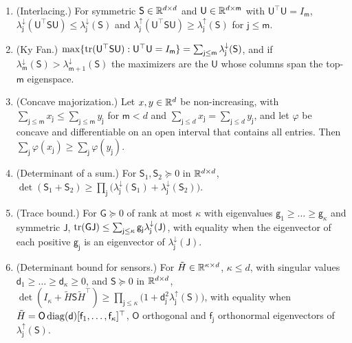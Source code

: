 \begin{lemma}\label{lem:env-eigen}
\begin{enumerate}
\item[(a)] (Interlacing.) For symmetric $\mathsf S\in\mathbb{R}^{d\times d}$ and $\mathsf U\in\mathbb{R}^{d\times\mathsf m}$ with $\mathsf U^\top\mathsf U=I_{\mathsf m}$, $\lambda^\downarrow_{\mathsf j}(\mathsf U^\top\mathsf S\mathsf U)\le\lambda^\downarrow_{\mathsf j}(\mathsf S)$ and $\lambda^\uparrow_{\mathsf j}(\mathsf U^\top\mathsf S\mathsf U)\ge\lambda^\uparrow_{\mathsf j}(\mathsf S)$ for $\mathsf j\le\mathsf m$.
\item[(b)] (Ky Fan.) $\max\{\operatorname{tr}(\mathsf U^\top\mathsf S\mathsf U):\mathsf U^\top\mathsf U=I_{\mathsf m}\}=\sum_{\mathsf j\le\mathsf m}\lambda^\downarrow_{\mathsf j}(\mathsf S)$, and if $\lambda^\downarrow_{\mathsf m}(\mathsf S)>\lambda^\downarrow_{\mathsf m+1}(\mathsf S)$ the maximizers are the $\mathsf U$ whose columns span the top-$\mathsf m$ eigenspace.
\item[(c)] (Concave majorization.) Let $x,y\in\mathbb{R}^d$ be non-increasing, with $\sum_{\mathsf j\le\mathsf m}x_{\mathsf j}\le\sum_{\mathsf j\le\mathsf m}y_{\mathsf j}$ for $\mathsf m<d$ and $\sum_{\mathsf j\le d}x_{\mathsf j}=\sum_{\mathsf j\le d}y_{\mathsf j}$, and let $\varphi$ be concave and differentiable on an open interval that contains all entries. Then $\sum_{\mathsf j}\varphi(x_{\mathsf j})\ge\sum_{\mathsf j}\varphi(y_{\mathsf j})$.
\item[(d)] (Determinant of a sum.) For $\mathsf S_1,\mathsf S_2\succeq0$ in $\mathbb{R}^{d\times d}$, $\det(\mathsf S_1+\mathsf S_2)\ge\prod_{\mathsf j}\bigl(\lambda^\downarrow_{\mathsf j}(\mathsf S_1)+\lambda^\downarrow_{\mathsf j}(\mathsf S_2)\bigr)$.
\item[(e)] (Trace bound.) For $\mathsf G\succeq0$ of rank at most $\kappa$ with eigenvalues $\mathsf g_1\ge\dots\ge\mathsf g_\kappa$ and symmetric $\mathsf J$, $\operatorname{tr}(\mathsf G\mathsf J)\le\sum_{\mathsf j\le\kappa}\mathsf g_{\mathsf j}\lambda^\downarrow_{\mathsf j}(\mathsf J)$, with equality when the eigenvector of each positive $\mathsf g_{\mathsf j}$ is an eigenvector of $\lambda^\downarrow_{\mathsf j}(\mathsf J)$.
\item[(f)] (Determinant bound for sensors.) For $\tilde H\in\mathbb{R}^{\kappa\times d}$, $\kappa\le d$, with singular values $\mathsf d_1\ge\dots\ge\mathsf d_\kappa\ge0$, and $\mathsf S\succeq0$ in $\mathbb{R}^{d\times d}$, $\det(I_\kappa+\tilde H\mathsf S\tilde H^\top)\ge\prod_{\mathsf j\le\kappa}\bigl(1+\mathsf d_{\mathsf j}^2\lambda^\uparrow_{\mathsf j}(\mathsf S)\bigr)$, with equality when $\tilde H=\mathsf O\operatorname{diag}(\mathsf d)[\mathsf f_1,\dots,\mathsf f_\kappa]^\top$, $\mathsf O$ orthogonal and $\mathsf f_{\mathsf j}$ orthonormal eigenvectors of $\lambda^\uparrow_{\mathsf j}(\mathsf S)$.
\end{enumerate}
\end{lemma}


